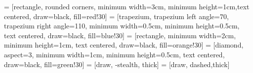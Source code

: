 
 = [rectangle, rounded corners, minimum width=3cm, minimum height=1cm,text centered, draw=black, fill=red!30]
 = [trapezium, trapezium left angle=70, trapezium right angle=110, minimum width=0.5cm, minimum height=0.5cm, text centered, draw=black, fill=blue!30]
 = [rectangle, minimum width=2cm, minimum height=1cm, text centered, draw=black, fill=orange!30]
 = [diamond, aspect=3, minimum width=1cm, minimum height=0.5cm, text centered, draw=black, fill=green!30]
 = [draw, -stealth, thick]
 = [draw, dashed,thick]

